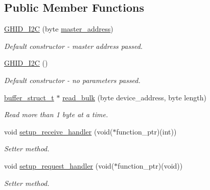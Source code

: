 \subsection*{\-Public \-Member \-Functions}
\begin{DoxyCompactItemize}
\item 
\hyperlink{class_g_h_i_d___i2_c_ac2a1139ab93465a05ff0006c2e21c052}{\-G\-H\-I\-D\-\_\-\-I2\-C} (byte \hyperlink{class_g_h_i_d___i2_c_ab168a66728f51bbbd877d604ebb18492}{master\-\_\-address})
\begin{DoxyCompactList}\small\item\em \-Default constructor -\/ master address passed. \end{DoxyCompactList}\item 
\hyperlink{class_g_h_i_d___i2_c_a7875b11751da7c1f1834bf6b3ec40b81}{\-G\-H\-I\-D\-\_\-\-I2\-C} ()
\begin{DoxyCompactList}\small\item\em \-Default constructor -\/ no parameters passed. \end{DoxyCompactList}\item 
\hyperlink{structbuffer__struct__t}{buffer\-\_\-struct\-\_\-t} $\ast$ \hyperlink{class_g_h_i_d___i2_c_ace72253b2b6d54a4a43089d46bc816e0}{read\-\_\-bulk} (byte device\-\_\-address, byte length)
\begin{DoxyCompactList}\small\item\em \-Read more than 1 byte at a time. \end{DoxyCompactList}\item 
void \hyperlink{class_g_h_i_d___i2_c_a0c887fe9ea0fa9b5dd9bec7305517d51}{setup\-\_\-receive\-\_\-handler} (void($\ast$function\-\_\-ptr)(int))
\begin{DoxyCompactList}\small\item\em \-Setter method. \end{DoxyCompactList}\item 
void \hyperlink{class_g_h_i_d___i2_c_ad468c96e0459607e6f21cde030b74377}{setup\-\_\-request\-\_\-handler} (void($\ast$function\-\_\-ptr)(void))
\begin{DoxyCompactList}\small\item\em \-Setter method. \end{DoxyCompactList}\end{DoxyCompactItemize}
